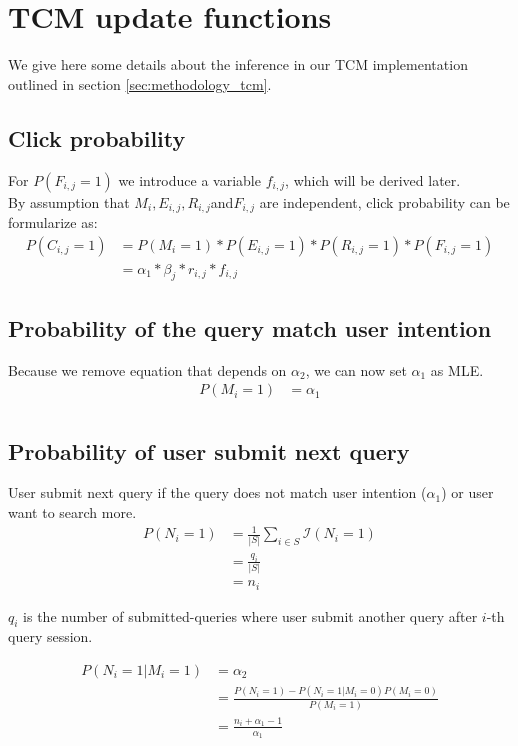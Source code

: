 \section{TCM update functions}
\label{app:tcm_eq}
We give here some details about the inference in our TCM implementation outlined in section \ref{sec:methodology_tcm}.

\subsection{Click probability}
For $P(F_{i,j}=1)$ we introduce a variable $f_{i,j}$, which will be derived later. \\
By assumption that $M_i, E_{i,j},R_{i,j}$and$F_{i,j}$ are independent, click probability can be formularize as:
\begin{align}
P(C_{i,j} = 1)
&= P(M_i=1) * P(E_{i,j}=1) * P(R_{i,j}=1) * P(F_{i,j} = 1) \nonumber\\
&= \alpha_1 * \beta_j * r_{i,j} * f_{i,j}
\label{eq:proba_click}
\end{align}

\subsection{Probability of the query match user intention}
Because we remove equation that depends on $\alpha_2$, we can now set $\alpha_1$ as MLE.
\begin{align*}
P(M_i = 1) 
&= \alpha_1 \\
\end{align*}

\subsection{Probability of user submit next query}
User submit next query if the query does not match user intention ($\alpha_1$) or user want to search more.
\begin{align*}
P(N_i=1) 
&= \frac{1}{|S|} \sum_{i\in S} \mathcal{I}(N_i=1) \\
&= \frac{q_i}{|S|} \\
&= n_i
\end{align*}

$q_i$ is the number of submitted-queries where user submit another query after $i$-th query session.

\begin{align*}
P(N_i=1|M_i=1) 
&= \alpha_2 \\
&= \frac{P(N_i=1) - P(N_i=1|M_i=0)P(M_i=0)}{P(M_i=1)} \\
&= \frac{n_i + \alpha_1 - 1}{\alpha_1}
\end{align*}

